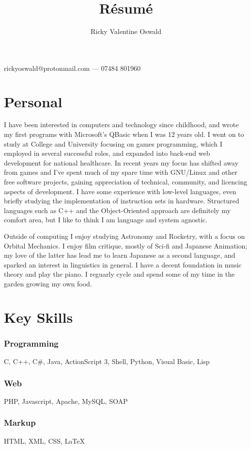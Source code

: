 \documentclass{article}
\makeatletter
\renewcommand{\maketitle}{
\begin{center}
{\huge\sc
\theauthor}

\vspace{.25em}

rickyoswald@protonmail.com --- 07484 801960
\end{center}
}
\makeatother
\begin{document}
\title{R\'esum\'e}
\author{Ricky Valentine Oswald}

\maketitle

\section{Personal}
I have been interested in computers and technology since childhood, and wrote my first programs with Microsoft's QBasic when I was 12 years old.  I went on to study at College and University focusing on games programming, which I employed in several successful roles, and expanded into back-end web development for national healthcare.  In recent years my focus has shifted away from games and I've spent much of my spare time with GNU/Linux and other free software projects, gaining appreciation of technical, community, and licencing aspects of development.  I have some experience with low-level languages, even briefly studying the implementation of instruction sets in hardware.  Structured languages such as C++ and the Object-Oriented approach are definitely my comfort area, but I like to think I am language and system agnostic.

Outside of computing I enjoy studying Astronomy and Rocketry, with a focus on Orbital Mechanics.  I enjoy film critique, mostly of Sci-fi and Japanese Animation; my love of the latter has lead me to learn Japanese as a second language, and sparked an interest in linguistics in general.  I have a decent foundation in music theory and play the piano.  I reguarly cycle and spend some of my time in the garden growing my own food.

\section{Key Skills}
\subsubsection{Programming}
C, C++, C\#, Java, ActionScript 3, Shell, Python, Visual Basic, Lisp
\subsubsection{Web}
PHP, Javascript, Apache, MySQL, SOAP
\subsubsection{Markup}
HTML, XML, CSS, {\LaTeX}
\end{document}
